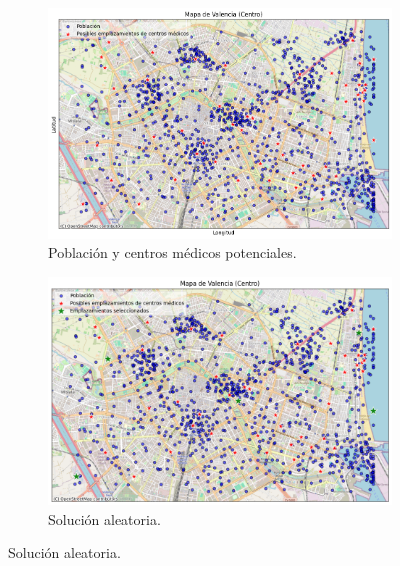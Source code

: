 \documentclass[12pt,a4paper]{book}
\begin{document}
\begin{figure}[H]
    \centering
    \begin{subfigure}{0.48\textwidth}
        \includegraphics[width=\textwidth]{images/centros_medicos.png}
        \caption{Población y centros médicos potenciales.}
        \label{fig:centros_medicos}
    \end{subfigure}
    \hfill
    \begin{subfigure}{0.48\textwidth}
        \includegraphics[width=\textwidth]{images/solucion_aleatoria.png}
        \caption{Solución aleatoria.}
        \label{fig:solucion_aleatoria}
    \end{subfigure}
    
    \vspace{0.5cm} %
    

\end{figure}
\end{document}
